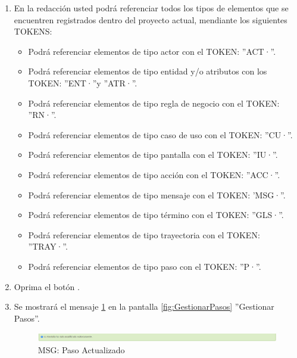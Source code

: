 \begin{enumerate}
			\item En la redacción usted podrá referenciar todos los tipos de elementos que se encuentren registrados dentro del proyecto actual, mendiante los siguientes TOKENS:
			
			\begin{itemize}
				\item Podrá referenciar elementos de tipo actor con el TOKEN: ''ACT·''.
				\item Podrá referenciar elementos de tipo entidad y/o atributos con los TOKEN: ''ENT·''y ''ATR·''.
				\item Podrá referenciar elementos de tipo regla de negocio con el TOKEN: ''RN·''.
				\item Podrá referenciar elementos de tipo caso de uso con el TOKEN: ''CU·''.
				\item Podrá referenciar elementos de tipo pantalla con el TOKEN: ''IU·''.
				\item Podrá referenciar elementos de tipo acción con el TOKEN: ''ACC·''.
				\item Podrá referenciar elementos de tipo mensaje con el TOKEN: 'MSG·''.
				\item Podrá referenciar elementos de tipo término con el TOKEN: ''GLS·''.
				\item Podrá referenciar elementos de tipo trayectoria con el TOKEN: ''TRAY·''.
				\item Podrá referenciar elementos de tipo paso con el TOKEN: ''P·''.
			\end{itemize}
						
			\item Oprima el botón \IUAceptar.
			
			\item Se mostrará el mensaje \ref{fig:pasoModificado} en la pantalla \ref{fig:GestionarPasos} ''Gestionar Pasos''.
			
			\begin{figure}[htbp!]
				\begin{center}
					\includegraphics[scale=0.5]{roles/lider/casosUso/pantallas/IU11-2MSG1}
					\caption{MSG: Paso Actualizado}
					\label{fig:pasoModificado}
				\end{center}
			\end{figure}
			\end{enumerate}